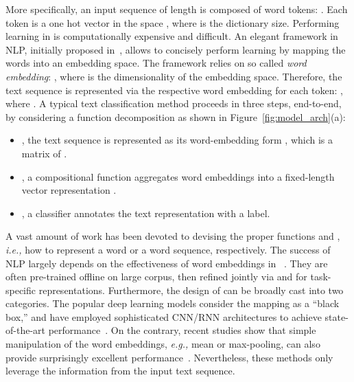 \documentclass[11pt,a4paper]{article}
\newcommand{\ie}[0]{\emph{i.e., }}
\newcommand{\eg}[0]{\emph{e.g., }}
\begin{document}
More specifically, an input sequence  of length  is composed of word tokens: . Each token  is a one hot vector in the space , where  is the dictionary size. Performing learning in  is computationally expensive and difficult.
An elegant framework in NLP, initially proposed in~\cite{mikolov2013distributed,le2014distributed,pennington2014glove,kiros2015skip}, allows to concisely perform learning by mapping the words into an embedding space. The framework relies on so called {\em word embedding}: , where  is the dimensionality of the embedding space.
Therefore, the text sequence  is represented via the respective word embedding for each token: , where . A typical text classification method proceeds in three steps, end-to-end, by considering a function decomposition  as shown in Figure~\ref{fig:model_arch}(a):
\begin{itemize}
	\item , the text sequence is represented as its word-embedding form , which is a matrix of . 
		\vspace{-2mm}
	\item ,  a compositional function  aggregates word embeddings into a fixed-length vector representation .
		\vspace{-2mm}
	\item , a classifier  annotates the text representation  with a label.
\end{itemize}
A vast amount of work has been devoted to devising the proper functions  and , \ie how to represent a word or a word sequence, respectively. The success of NLP largely depends on the effectiveness of word embeddings in ~\cite{bengio2003neural,collobert2008unified,mikolov2013distributed,pennington2014glove}. They are often pre-trained offline on large corpus, then refined jointly via  and  for task-specific representations. 
Furthermore, the design of  can be broadly cast into two categories. The popular deep learning models consider the mapping as a ``black box,'' and have employed sophisticated CNN/RNN architectures to achieve state-of-the-art performance~\cite{zhang2015character,yang2016hierarchical}. On the contrary, recent studies show that simple manipulation of the word embeddings, \eg mean or max-pooling, can also provide surprisingly excellent performance~\cite{joulin2016bag,wieting2016towards,arora2017simple,shen2018on}. Nevertheless, these methods only leverage the information from the input text sequence.
\end{document}
